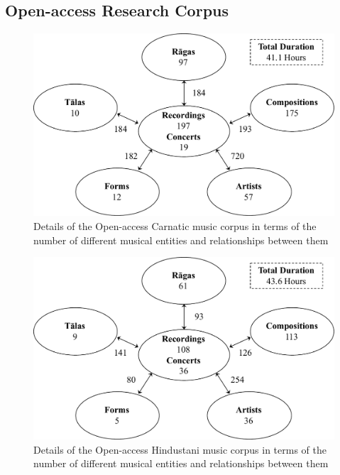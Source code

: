 \subsection{Open-access Research Corpus}
\label{sec:corpus_open_access_research_corpus}

\begin{figure}
	\begin{center}
		\includegraphics[width=\figSizeNinety]{ch04_datasets/figures/carnatic_corpus_cc.pdf}
	\end{center}
	\caption[Details of the Open-access Carnatic music corpus]{Details of the Open-access Carnatic music corpus in terms of the number of different musical entities and relationships between them}
	\label{fig:carnatic_cc_corpus_details}
\end{figure}

\begin{figure}
	\begin{center}
		\includegraphics[width=\figSizeNinety]{ch04_datasets/figures/hindustani_corpus_cc.pdf}
	\end{center}
	\caption[Details of the Open-access Hindustani music corpus]{Details of the Open-access Hindustani music corpus in terms of the number of different musical entities and relationships between them}
	\label{fig:hindustani_cc_corpus_details}
\end{figure}


